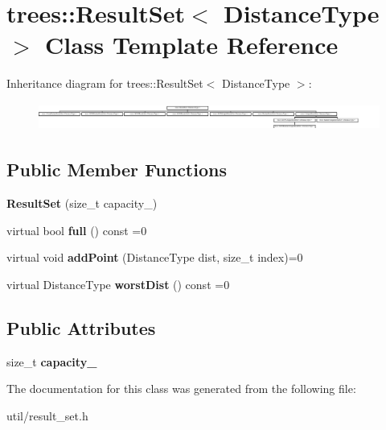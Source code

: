 \hypertarget{classtrees_1_1_result_set}{}\section{trees\+:\+:Result\+Set$<$ Distance\+Type $>$ Class Template Reference}
\label{classtrees_1_1_result_set}
Inheritance diagram for trees\+:\+:Result\+Set$<$ Distance\+Type $>$\+:\begin{figure}[H]
\begin{center}
\leavevmode
\includegraphics[height=0.906149cm]{classtrees_1_1_result_set}
\end{center}
\end{figure}
\subsection*{Public Member Functions}
\begin{DoxyCompactItemize}
\item 
\mbox{\label{classtrees_1_1_result_set_afe172e3581433bcc46fecdbb156cde8b}} 
{\bfseries Result\+Set} (size\+\_\+t capacity\+\_\+)
\item 
\mbox{\label{classtrees_1_1_result_set_ac35ee245b34f1f37fefbe994e85f5de5}} 
virtual bool {\bfseries full} () const =0
\item 
\mbox{\label{classtrees_1_1_result_set_a168f89986f238cd4e43e8a5e80bec025}} 
virtual void {\bfseries add\+Point} (Distance\+Type dist, size\+\_\+t index)=0
\item 
\mbox{\label{classtrees_1_1_result_set_a7e060d29f148a5d54cfb3e8ac63f8c18}} 
virtual Distance\+Type {\bfseries worst\+Dist} () const =0
\end{DoxyCompactItemize}
\subsection*{Public Attributes}
\begin{DoxyCompactItemize}
\item 
\mbox{\label{classtrees_1_1_result_set_ab38709e3e9911c7ff7598ab368dfdba1}} 
size\+\_\+t {\bfseries capacity\+\_\+}
\end{DoxyCompactItemize}


The documentation for this class was generated from the following file\+:\begin{DoxyCompactItemize}
\item 
util/result\+\_\+set.\+h\end{DoxyCompactItemize}
